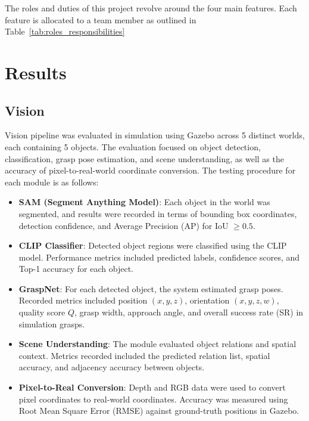 \documentclass[12pt]{extarticle}
\begin{document}
The roles and duties of this project revolve around the four main features. Each feature is allocated to a team member as outlined in Table~\ref{tab:roles_responsibilities}

\newpage
\section{Results}

\subsection{Vision}

Vision pipeline was evaluated in simulation using Gazebo across 5 distinct worlds, each containing 5 objects. The evaluation focused on object detection, classification, grasp pose estimation, and scene understanding, as well as the accuracy of pixel-to-real-world coordinate conversion. The testing procedure for each module is as follows:

\begin{itemize}
    \item \textbf{SAM (Segment Anything Model)}: Each object in the world was segmented, and results were recorded in terms of bounding box coordinates, detection confidence, and Average Precision (AP) for IoU $\geq 0.5$.
    
    \item \textbf{CLIP Classifier}: Detected object regions were classified using the CLIP model. Performance metrics included predicted labels, confidence scores, and Top-1 accuracy for each object.
    
    \item \textbf{GraspNet}: For each detected object, the system estimated grasp poses. Recorded metrics included position $(x, y, z)$, orientation $(x, y, z, w)$, quality score $Q$, grasp width, approach angle, and overall success rate (SR) in simulation grasps.
    
    \item \textbf{Scene Understanding}: The module evaluated object relations and spatial context. Metrics recorded included the predicted relation list, spatial accuracy, and adjacency accuracy between objects.
    
    \item \textbf{Pixel-to-Real Conversion}: Depth and RGB data were used to convert pixel coordinates to real-world coordinates. Accuracy was measured using Root Mean Square Error (RMSE) against ground-truth positions in Gazebo.
\end{itemize}
\end{document}
